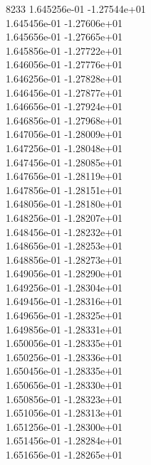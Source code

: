 8233	1.645256e-01	-1.27544e+01	\\ 	1.645456e-01	-1.27606e+01	\\ 	1.645656e-01	-1.27665e+01	\\ 	1.645856e-01	-1.27722e+01	\\ 	1.646056e-01	-1.27776e+01	\\ 	1.646256e-01	-1.27828e+01	\\ 	1.646456e-01	-1.27877e+01	\\ 	1.646656e-01	-1.27924e+01	\\ 	1.646856e-01	-1.27968e+01	\\ 	1.647056e-01	-1.28009e+01	\\ 	1.647256e-01	-1.28048e+01	\\ 	1.647456e-01	-1.28085e+01	\\ 	1.647656e-01	-1.28119e+01	\\ 	1.647856e-01	-1.28151e+01	\\ 	1.648056e-01	-1.28180e+01	\\ 	1.648256e-01	-1.28207e+01	\\ 	1.648456e-01	-1.28232e+01	\\ 	1.648656e-01	-1.28253e+01	\\ 	1.648856e-01	-1.28273e+01	\\ 	1.649056e-01	-1.28290e+01	\\ 	1.649256e-01	-1.28304e+01	\\ 	1.649456e-01	-1.28316e+01	\\ 	1.649656e-01	-1.28325e+01	\\ 	1.649856e-01	-1.28331e+01	\\ 	1.650056e-01	-1.28335e+01	\\ 	1.650256e-01	-1.28336e+01	\\ 	1.650456e-01	-1.28335e+01	\\ 	1.650656e-01	-1.28330e+01	\\ 	1.650856e-01	-1.28323e+01	\\ 	1.651056e-01	-1.28313e+01	\\ 	1.651256e-01	-1.28300e+01	\\ 	1.651456e-01	-1.28284e+01	\\ 	1.651656e-01	-1.28265e+01	\\ \hline
